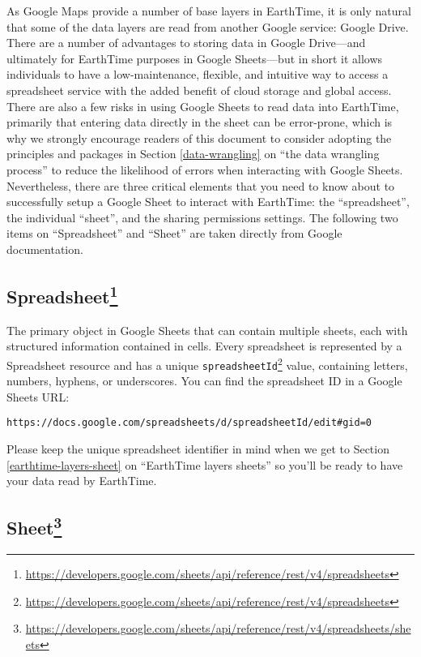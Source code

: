 \documentclass[
]{krantz}
\renewcommand{\href}[2]{#2\footnote{\url{#1}}}
\begin{document}
As Google Maps provide a number of base layers in EarthTime, it is only natural that some of the data layers are read from another Google service: Google Drive. There are a number of advantages to storing data in Google Drive---and ultimately for EarthTime purposes in Google Sheets---but in short it allows individuals to have a low-maintenance, flexible, and intuitive way to access a spreadsheet service with the added benefit of cloud storage and global access. There are also a few risks in using Google Sheets to read data into EarthTime, primarily that entering data directly in the sheet can be error-prone, which is why we strongly encourage readers of this document to consider adopting the principles and packages in Section \ref{data-wrangling} on ``the data wrangling process'' to reduce the likelihood of errors when interacting with Google Sheets. Nevertheless, there are three critical elements that you need to know about to successfully setup a Google Sheet to interact with EarthTime: the ``spreadsheet'', the individual ``sheet'', and the sharing permissions settings. The following two items on ``Spreadsheet'' and ``Sheet'' are taken directly from Google documentation.

\hypertarget{spreadsheet}{%
\subsection*{\texorpdfstring{\href{https://developers.google.com/sheets/api/reference/rest/v4/spreadsheets}{Spreadsheet}}{Spreadsheet}}\label{spreadsheet}}


The primary object in Google Sheets that can contain multiple sheets, each with structured information contained in cells. Every spreadsheet is represented by a Spreadsheet resource and has a unique \href{https://developers.google.com/sheets/api/reference/rest/v4/spreadsheets}{\texttt{spreadsheetId}} value, containing letters, numbers, hyphens, or underscores. You can find the spreadsheet ID in a Google Sheets URL:

\texttt{https://docs.google.com/spreadsheets/d/spreadsheetId/edit\#gid=0}

Please keep the unique spreadsheet identifier in mind when we get to Section \ref{earthtime-layers-sheet} on ``EarthTime layers sheets'' so you'll be ready to have your data read by EarthTime.

\hypertarget{sheet}{%
\subsection*{\texorpdfstring{\href{https://developers.google.com/sheets/api/reference/rest/v4/spreadsheets/sheets}{Sheet}}{Sheet}}\label{sheet}}
\end{document}
